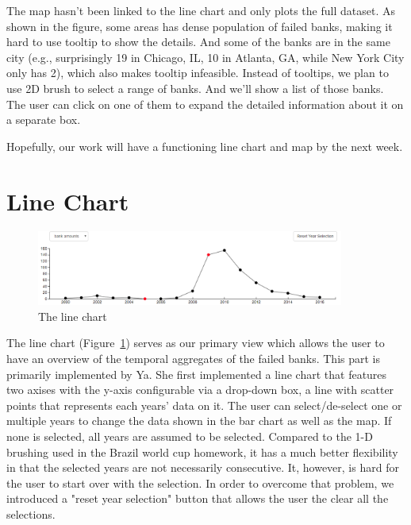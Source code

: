 The map hasn't been linked to the line chart and only plots the full dataset.
As shown in the figure, some areas has dense population of failed banks,
making it hard to use tooltip to show the details. And some of the banks are
in the same city (e.g., surprisingly 19 in Chicago, IL, 10 in Atlanta, GA,
while New York City only has 2), which also makes tooltip infeasible. Instead
of tooltips, we plan to use 2D brush to select a range of banks. And we'll
show a list of those banks. The user can click on one of them to expand the
detailed information about it on a separate box.

Hopefully, our work will have a functioning line chart and map by the next
week.

\newpage

\section{Line Chart}

\begin{figure}[!h]
    \centering
    \includegraphics[width=0.9\textwidth]{fig/linechart}
    \caption{The line chart}
    \label{fig:linechart}
\end{figure}

The line chart (Figure~\ref{fig:linechart}) serves as our primary view
which allows the user to have an overview of the temporal aggregates of the
failed banks. This part is primarily implemented by Ya. She first implemented
a line chart that features two axises with the y-axis configurable via a
drop-down box, a line with scatter points that represents each years' data on
it. The user can select/de-select one or multiple years to change the data
shown in the bar chart as well as the map. If none is selected, all years are
assumed to be selected. Compared to the 1-D brushing used in the Brazil world
cup homework, it has a much better flexibility in that the selected years are
not necessarily consecutive. It, however, is hard for the user to start over
with the selection. In order to overcome that problem, we introduced a "reset
year selection" button that allows the user the clear all the selections.

\newpage


